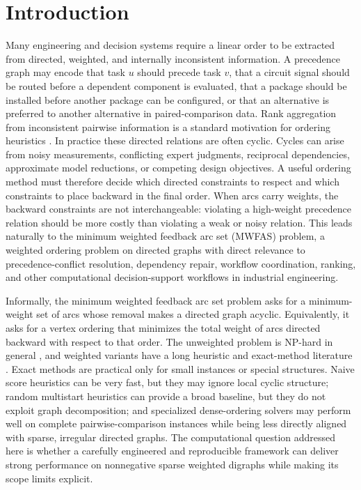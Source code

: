 \section{Introduction}
\label{sec:introduction}

Many engineering and decision systems require a linear order to be extracted from directed, weighted, and internally inconsistent information. A precedence graph may encode that task \(u\) should precede task \(v\), that a circuit signal should be routed before a dependent component is evaluated, that a package should be installed before another package can be configured, or that an alternative is preferred to another alternative in paired-comparison data. Rank aggregation from inconsistent pairwise information is a standard motivation for ordering heuristics \cite{ACN08}. In practice these directed relations are often cyclic. Cycles can arise from noisy measurements, conflicting expert judgments, reciprocal dependencies, approximate model reductions, or competing design objectives. A useful ordering method must therefore decide which directed constraints to respect and which constraints to place backward in the final order. When arcs carry weights, the backward constraints are not interchangeable: violating a high-weight precedence relation should be more costly than violating a weak or noisy relation. This leads naturally to the minimum weighted feedback arc set (MWFAS) problem, a weighted ordering problem on directed graphs with direct relevance to precedence-conflict resolution, dependency repair, workflow coordination, ranking, and other computational decision-support workflows in industrial engineering.

Informally, the minimum weighted feedback arc set problem asks for a minimum-weight set of arcs whose removal makes a directed graph acyclic. Equivalently, it asks for a vertex ordering that minimizes the total weight of arcs directed backward with respect to that order. The unweighted problem is NP-hard in general \cite{K72}, and weighted variants have a long heuristic and exact-method literature \cite{F90,BSNA21}. Exact methods are practical only for small instances or special structures. Naive score heuristics can be very fast, but they may ignore local cyclic structure; random multistart heuristics can provide a broad baseline, but they do not exploit graph decomposition; and specialized dense-ordering solvers may perform well on complete pairwise-comparison instances while being less directly aligned with sparse, irregular directed graphs. The computational question addressed here is whether a carefully engineered and reproducible framework can deliver strong performance on nonnegative sparse weighted digraphs while making its scope limits explicit.

